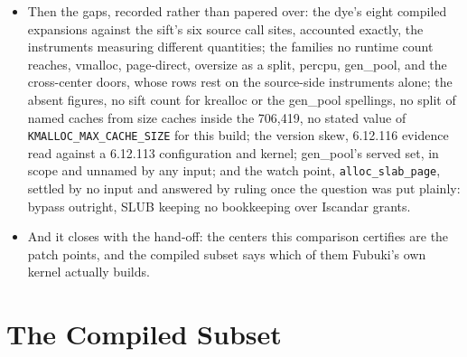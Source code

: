 \documentclass[11pt]{article}
\begin{document}
\begin{itemize}
\item Then the gaps, recorded rather than papered over: the dye's eight compiled expansions against the sift's six source call sites, accounted exactly, the instruments measuring different quantities; the families no runtime count reaches, vmalloc, page-direct, oversize as a split, percpu, gen\_pool, and the cross-center doors, whose rows rest on the source-side instruments alone; the absent figures, no sift count for krealloc or the gen\_pool spellings, no split of named caches from size caches inside the 706,419, no stated value of \texttt{KMALLOC\_MAX\_CACHE\_SIZE} for this build; the version skew, 6.12.116 evidence read against a 6.12.113 configuration and kernel; gen\_pool's served set, in scope and unnamed by any input; and the watch point, \texttt{alloc\_slab\_page}, settled by no input and answered by ruling once the question was put plainly: bypass outright, SLUB keeping no bookkeeping over Iscandar grants.
\item And it closes with the hand-off: the centers this comparison certifies are the patch points, and the compiled subset says which of them Fubuki's own kernel actually builds.
\end{itemize}

\section{The Compiled Subset}
\end{document}
